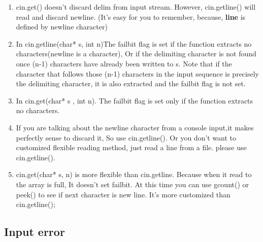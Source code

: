 \documentclass[a4paper,11pt,twoside]{book}
\begin{document}
\begin{itemize}
\begin{enumerate}
		\item cin.get() doesn't discard delim from input stream. However, cin.getline() will read and discard newline.  (It's easy for you to remember, because, \textbf{line} is defined by newline character)
		
		\item In cin.getline(char* s, int n)The failbit flag is set if the function extracts no characters(newline is a character), Or if the delimiting character is not found once (n-1) characters have already been written to s. Note that if the character that follows those (n-1) characters in the input sequence is precisely the delimiting character, it is also extracted and the failbit flag is not set.
		
		\item In cin.get(char* s ,  int n). The failbit flag is set only if the function extracts no characters.
		
		\item If you are talking about the newline character from a console input,it makes perfectly sense to discard it, So use cin.getline(). Or you don't want to customized flexible reading method, just read a line from a file. please use cin.getline().
		
		\item cin.get(char* s, n) is more flexible than cin.getline. Because when it read to the array is full, It doesn't set failbit. At this time you can use gcount() or peek() to see if next character is new line. It's more customized than  cin.getline();
	\end{enumerate}
	
\end{itemize}

\subsection{Input error}
\end{document}
